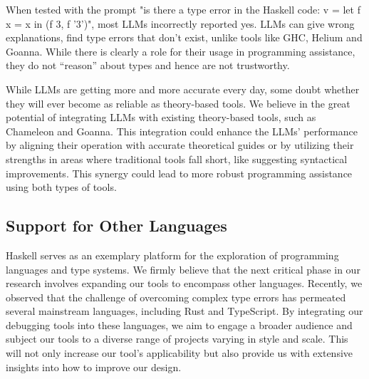 When tested with the prompt "is there a type error in the Haskell code: v = let f x = x in (f 3, f '3')", most LLMs incorrectly reported yes. LLMs can give wrong explanations, find type errors that don't exist, unlike tools like GHC, Helium and Goanna. While there is clearly a role for their usage in programming assistance, they do not “reason” about types and hence are not trustworthy.

While LLMs are getting more and more accurate every day, some doubt whether they will ever become as reliable as theory-based tools. We believe in the great potential of integrating LLMs with existing theory-based tools, such as Chameleon and Goanna. This integration could enhance the LLMs' performance by aligning their operation with accurate theoretical guides or by utilizing their strengths in areas where traditional tools fall short, like suggesting syntactical improvements. This synergy could lead to more robust programming assistance using both types of tools.


\subsection{Support for Other Languages}
Haskell serves as an exemplary platform for the exploration of programming languages and type systems. We firmly believe that the next critical phase in our research involves expanding our tools to encompass other languages. Recently, we observed that the challenge of overcoming complex type errors has permeated several mainstream languages, including Rust and TypeScript. By integrating our debugging tools into these languages, we aim to engage a broader audience and subject our tools to a diverse range of projects varying in style and scale. This will not only increase our tool's applicability but also provide us with extensive insights into how to improve our design.

